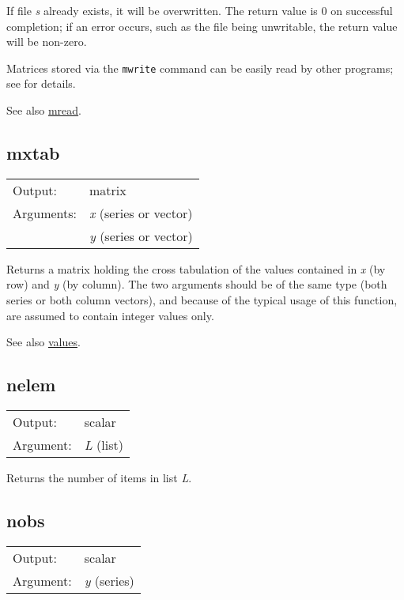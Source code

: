 	  If file \textsl{s} already exists, it will be
	  overwritten. The return value is 0 on successful completion; if
	  an error occurs, such as the file being unwritable, the return
	  value will be non-zero.

	  Matrices stored via the \texttt{mwrite} command can be easily
	  read by other programs; see \GUG{} for
	  details.

	  See also \hyperlink{func-mread}{mread}.

\subsection{mxtab}
\hypertarget{func-mxtab}{}

\begin{tabular}{ll}
Output:     & matrix\\
Arguments:  & \textsl{x} (series or vector)\\
           & \textsl{y} (series or vector)\\
\end{tabular}

	  Returns a matrix holding the cross tabulation of the values
	  contained in \textsl{x} (by row) and
	  \textsl{y} (by column). The two arguments should be of
	  the same type (both series or both column vectors), and because
	  of the typical usage of this function, are assumed to contain
	  integer values only.

	  See also \hyperlink{func-values}{values}.

\subsection{nelem}
\hypertarget{func-nelem}{}

\begin{tabular}{ll}
Output:     & scalar\\
Argument:   & \textsl{L} (list)\\
\end{tabular}

	  Returns the number of items in list \textsl{L}.

\subsection{nobs}
\hypertarget{func-nobs}{}

\begin{tabular}{ll}
Output:     & scalar\\
Argument:   & \textsl{y} (series)\\
\end{tabular}

